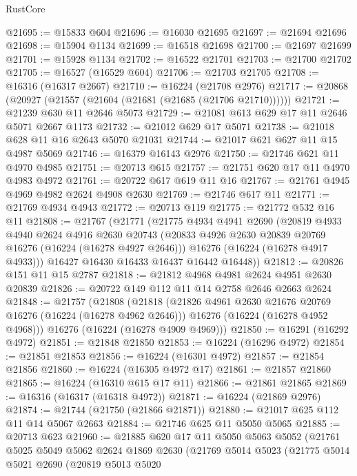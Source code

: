 \begin{lexlean}{RustCore}
\begin{coremodule}
@21695 := @15833 @604
@21696 := @16030 @21695
@21697 := @21694 @21696
@21698 := @15904 @1134
@21699 := @16518 @21698
@21700 := @21697 @21699
@21701 := @15928 @1134
@21702 := @16522 @21701
@21703 := @21700 @21702
@21705 := @16527 (@16529 @604)
@21706 := @21703 @21705
@21708 := @16316 (@16317 @2667)
@21710 := @16224 (@21708 @2976)
@21717 := @20868 (@20927 (@21557 (@21604 (@21681 (@21685 (@21706 @21710))))))
@21721 := @21239 @630 @11 @2646 @5073
@21729 := @21081 @613 @629 @17 @11 @2646 @5071 @2667 @1173
@21732 := @21012 @629 @17 @5071
@21738 := @21018 @628 @11 @16 @2643 @5070 @21031
@21744 := @21017 @621 @627 @11 @15 @4987 @5069
@21746 := @16379 @16143 @2976
@21750 := @21746 @621 @11 @4970 @4985
@21751 := @20713 @615
@21757 := @21751 @620 @17 @11 @4970 @4983 @4972
@21761 := @20722 @617 @619 @11 @16
@21767 := @21761 @4945 @4969 @4982 @2624 @4908 @2630
@21769 := @21746 @617 @11
@21771 := @21769 @4934 @4943
@21772 := @20713 @119
@21775 := @21772 @532 @16 @11
@21808 := @21767
    (@21771
      (@21775
        @4934
        @4941
        @2690
        (@20819
          @4933
          @4940
          @2624
          @4916
          @2630
          @20743
          (@20833 @4926 @2630 @20839 @20769 @16276 (@16224 (@16278 @4927 @2646)))
          @16276
          (@16224 (@16278 @4917 @4933)))
        @16427
        @16430
        @16433
        @16437
        @16442
        @16448))
@21812 := @20826 @151 @11 @15 @2787
@21818 := @21812 @4968 @4981 @2624 @4951 @2630 @20839
@21826 := @20722 @149 @112 @11 @14 @2758 @2646 @2663 @2624
@21848 := @21757
    (@21808
      (@21818
        (@21826 @4961 @2630 @21676 @20769 @16276 (@16224 (@16278 @4962 @2646)))
        @16276
        (@16224 (@16278 @4952 @4968)))
      @16276
      (@16224 (@16278 @4909 @4969)))
@21850 := @16291 (@16292 @4972)
@21851 := @21848 @21850
@21853 := @16224 (@16296 @4972)
@21854 := @21851 @21853
@21856 := @16224 (@16301 @4972)
@21857 := @21854 @21856
@21860 := @16224 (@16305 @4972 @17)
@21861 := @21857 @21860
@21865 := @16224 (@16310 @615 @17 @11)
@21866 := @21861 @21865
@21869 := @16316 (@16317 (@16318 @4972))
@21871 := @16224 (@21869 @2976)
@21874 := @21744 (@21750 (@21866 @21871))
@21880 := @21017 @625 @112 @11 @14 @5067 @2663
@21884 := @21746 @625 @11 @5050 @5065
@21885 := @20713 @623
@21960 := @21885
    @620
    @17
    @11
    @5050
    @5063
    @5052
    (@21761
      @5025
      @5049
      @5062
      @2624
      @1869
      @2630
      (@21769
        @5014
        @5023
        (@21775
          @5014
          @5021
          @2690
          (@20819
            @5013
            @5020

\end{coremodule}
\end{lexlean}
